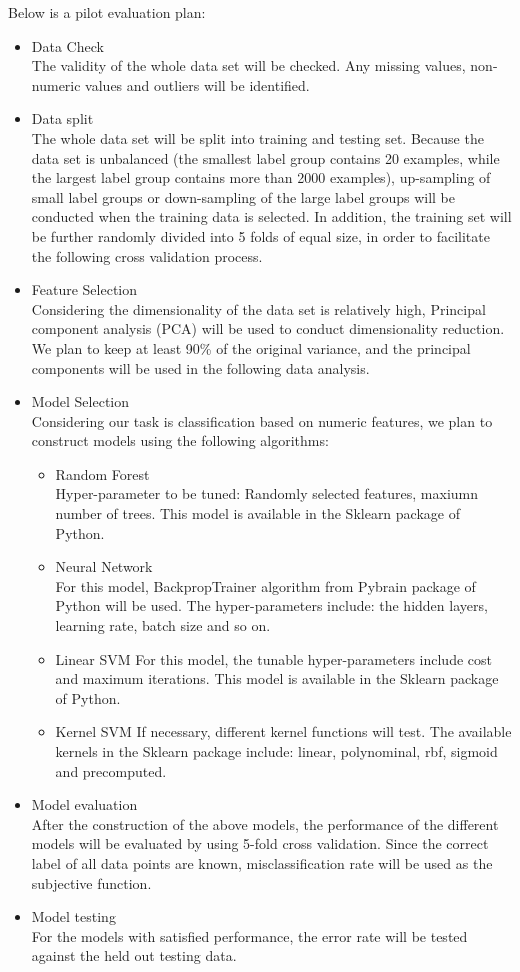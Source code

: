 \documentclass[11pt]{article}
\begin{document}
Below is a pilot evaluation plan:
\begin{itemize}
	\item Data Check \\
	The validity of the whole data set will be checked. Any missing values, non-numeric values and outliers will be identified.
	\item Data split\\
	The whole data set will be split into training and testing set. Because the data set is unbalanced (the smallest label group contains 20 examples, while the largest label group contains more than 2000 examples), up-sampling of small label groups or down-sampling of the large label groups will be conducted when the training data is selected. In addition, the training set will be further randomly divided into 5 folds of equal size, in order to facilitate the following cross validation process.
	\item Feature Selection \\
	Considering the dimensionality of the data set is relatively high, Principal component analysis (PCA) will be used to conduct dimensionality reduction. We plan to keep at least 90\% of the original variance, and the principal components will be used in the following data analysis.
	\item Model Selection \\
	Considering our task is classification based on numeric features, we plan to construct models using the following algorithms:
		\begin{itemize}
		\item Random Forest \\
		Hyper-parameter to be tuned: Randomly selected features, maxiumn number of trees. This model is available in the Sklearn package of Python. 
		\item Neural Network \\
		For this model, BackpropTrainer algorithm from Pybrain package of Python will be used. The hyper-parameters include: the hidden layers, learning rate, batch size and so on.
		\item Linear SVM
		For this model, the tunable hyper-parameters include cost and maximum iterations. This model is available in the Sklearn package of Python.
		\item Kernel SVM
		If necessary, different kernel functions will test. The available kernels in the Sklearn package include: linear, polynominal, rbf, sigmoid and precomputed. 
		\end{itemize}
		
	\item Model evaluation \\
	After the construction of the above models, the performance of the different models will be evaluated by using 5-fold cross validation. Since the correct label of all data points are known, misclassification rate will be used as the subjective function.
	\item Model testing \\
	For the models with satisfied performance, the error rate will be tested against the held out testing data.
	
\end{itemize}


%
%
\end{document}
